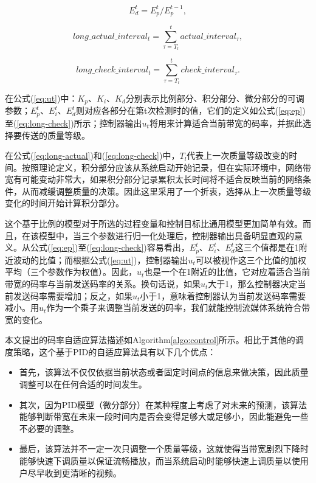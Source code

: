 \begin{equation}
\label{eq:ed}
E_d^t = E_p^t/E_p^{t - 1} ,
\end{equation}

\begin{equation}
\label{eq:long-actual}
long\_actual\_interva{l_t} = \sum\limits_{\tau = {T_l}}^t {actual\_interva{l_\tau}} ,
\end{equation}

\begin{equation}
\label{eq:long-check}
long\_check\_interva{l_t} = \sum\limits_{\tau = {T_l}}^t {check\_interva{l_\tau}} .
\end{equation}

在公式(\ref{eq:ut})中：$K_p$、$K_i$、$K_d$分别表示比例部分、积分部分、微分部分的可调参数；$E_p^t$、$E_i^t$、$E_d^t$则对应各部分在第t次检测时的值，它们的定义如公式(\ref{eq:ep})至(\ref{eq:long-check})所示；控制器输出$u_t$将用来计算适合当前带宽的码率，并据此选择要传送的质量等级。

在公式(\ref{eq:long-actual})和(\ref{eq:long-check})中，$T_l$代表上一次质量等级改变的时间。按照理论定义，积分部分应该从系统启动开始记录，但在实际环境中，网络带宽有可能变动非常大，如果积分部分记录累积太长时间将不适合反映当前的网络条件，从而减缓调整质量的决策。因此这里采用了一个折衷，选择从上一次质量等级变化的时间开始计算积分部分。

这个基于比例的模型对于所选的过程变量和控制目标比通用模型更加简单有效。而且，在该模型中，当三个参数进行归一化处理后，控制器输出具备明显直观的意义。从公式(\ref{eq:ep})至(\ref{eq:long-check})容易看出，$E_p^t$、$E_i^t$、$E_d^t$这三个值都是在1附近波动的比值；而根据公式(\ref{eq:ut})，控制器输出$u_t$可以被视作这三个比值的加权平均（三个参数作为权值）。因此，$u_t$也是一个在1附近的比值，它对应着适合当前带宽的码率与当前发送码率的关系。换句话说，如果$u_t$大于1，那么控制器决定当前发送码率需要增加；反之，如果$u_t$小于1，意味着控制器认为当前发送码率需要减小。用$u_t$作为一个乘子来调整当前发送的码率，我们就能控制流媒体系统符合带宽的变化。

本文提出的码率自适应算法描述如Algorithm\ref{algo:control}所示。相比于其他的调度策略，这个基于PID的自适应算法具有以下几个优点：
\begin{itemize}
	\item 首先，该算法不仅仅依据当前状态或者固定时间点的信息来做决策，因此质量调整可以在任何合适的时间发生。
	\item 其次，因为PID模型（微分部分）在某种程度上考虑了对未来的预测，该算法能够判断带宽在未来一段时间内是否会变得足够大或足够小，因此能避免一些不必要的调整。
	\item 最后，该算法并不一定一次只调整一个质量等级，这就使得当带宽剧烈下降时能够快速下调质量以保证流畅播放，而当系统启动时能够快速上调质量以使用户尽早收到更清晰的视频。
\end{itemize}

